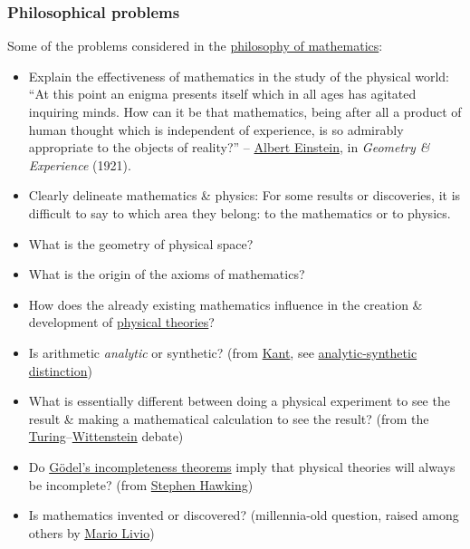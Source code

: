 \documentclass{article}
\begin{document}
\subsubsection{Philosophical problems}
Some of the problems considered in the \href{https://en.wikipedia.org/wiki/Philosophy_of_mathematics}{philosophy of mathematics}:
\begin{itemize}
	\item Explain the effectiveness of mathematics in the study of the physical world: ``At this point an enigma presents itself which in all ages has agitated inquiring minds. How can it be that mathematics, being after all a product of human thought which is independent of experience, is so admirably appropriate to the objects of reality?'' -- \href{https://en.wikipedia.org/wiki/Albert_Einstein}{\sc Albert Einstein}, in {\it Geometry \& Experience} (1921).
	\item Clearly delineate mathematics \& physics: For some results or discoveries, it is difficult to say to which area they belong: to the mathematics or to physics.
	\item What is the geometry of physical space?
	\item What is the origin of the axioms of mathematics?
	\item How does the already existing mathematics influence in the creation \& development of \href{https://en.wikipedia.org/wiki/Theoretical_physics#Overview}{physical theories}?
	\item Is arithmetic {\it analytic} or synthetic? (from \href{https://en.wikipedia.org/wiki/Immanuel_Kant}{\sc Kant}, see \href{https://en.wikipedia.org/wiki/Analytic%E2%80%93synthetic_distinction}{analytic-synthetic distinction})
	\item What is essentially different between doing a physical experiment to see the result \& making a mathematical calculation to see the result? (from the \href{https://en.wikipedia.org/wiki/Alan_Turing}{\sc Turing}--\href{https://en.wikipedia.org/wiki/Ludwig_Wittgenstein}{Wittenstein} debate)
	\item Do \href{https://en.wikipedia.org/wiki/G%C3%B6del%27s_incompleteness_theorems}{{\sc G\"odel}'s incompleteness theorems} imply that physical theories will always be incomplete? (from \href{https://en.wikipedia.org/wiki/Stephen_Hawking}{\sc Stephen Hawking})
	\item Is mathematics invented or discovered? (millennia-old question, raised among others by \href{https://en.wikipedia.org/wiki/Mario_Livio}{\sc Mario Livio})
\end{itemize}
\end{document}
